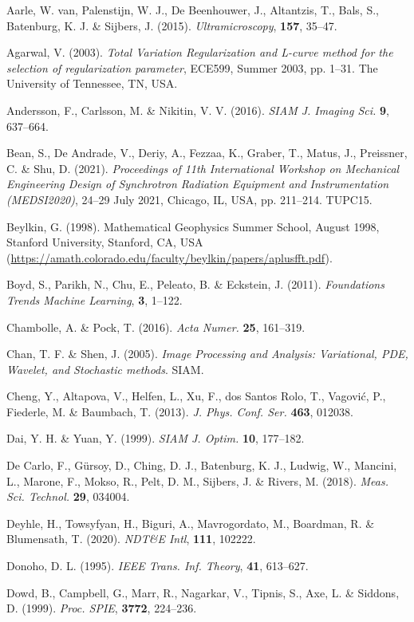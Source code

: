 \documentclass{article}
\begin{document}
\begin{hangpars}
Aarle, W. van, Palenstijn, W. J., De Beenhouwer, J., Altantzis, T., Bals, S., Batenburg, K. J. \& Sijbers, J. (2015). \emph{Ultramicroscopy}, \textbf{157}, 35–47.

Agarwal, V. (2003). \emph{Total Variation Regularization and L-curve method for the selection of regularization parameter}, ECE599, Summer 2003, pp. 1–31. The University of Tennessee, TN, USA.

Andersson, F., Carlsson, M. \& Nikitin, V. V. (2016). \emph{SIAM J. Imaging Sci.} \textbf{9}, 637–664.

Bean, S., De Andrade, V., Deriy, A., Fezzaa, K., Graber, T., Matus, J., Preissner, C. \& Shu, D. (2021). \emph{Proceedings of 11th International Workshop on Mechanical Engineering Design of Synchrotron Radiation Equipment and Instrumentation (MEDSI2020)}, 24–29 July 2021, Chicago, IL, USA, pp. 211–214. TUPC15.

Beylkin, G. (1998). Mathematical Geophysics Summer School, August 1998, Stanford University, Stanford, CA, USA (\url{https://amath.colorado.edu/faculty/beylkin/papers/aplusfft.pdf}).

Boyd, S., Parikh, N., Chu, E., Peleato, B. \& Eckstein, J. (2011). \emph{Foundations Trends Machine Learning}, \textbf{3}, 1–122.

Chambolle, A. \& Pock, T. (2016). \emph{Acta Numer.} \textbf{25}, 161–319.

Chan, T. F. \& Shen, J. (2005). \emph{Image Processing and Analysis: Variational, PDE, Wavelet, and Stochastic methods}. SIAM.

Cheng, Y., Altapova, V., Helfen, L., Xu, F., dos Santos Rolo, T., Vagović, P., Fiederle, M. \& Baumbach, T. (2013). \emph{J. Phys. Conf. Ser.} \textbf{463}, 012038.

Dai, Y. H. \& Yuan, Y. (1999). \emph{SIAM J. Optim.} \textbf{10}, 177–182.

De Carlo, F., Gürsoy, D., Ching, D. J., Batenburg, K. J., Ludwig, W., Mancini, L., Marone, F., Mokso, R., Pelt, D. M., Sijbers, J. \& Rivers, M. (2018). \emph{Meas. Sci. Technol.} \textbf{29}, 034004.

Deyhle, H., Towsyfyan, H., Biguri, A., Mavrogordato, M., Boardman, R. \& Blumensath, T. (2020). \emph{NDT\&E Intl}, \textbf{111}, 102222.

Donoho, D. L. (1995). \emph{IEEE Trans. Inf. Theory}, \textbf{41}, 613–627.

Dowd, B., Campbell, G., Marr, R., Nagarkar, V., Tipnis, S., Axe, L. \& Siddons, D. (1999). \emph{Proc. SPIE}, \textbf{3772}, 224–236.


\end{hangpars}
\end{document}
